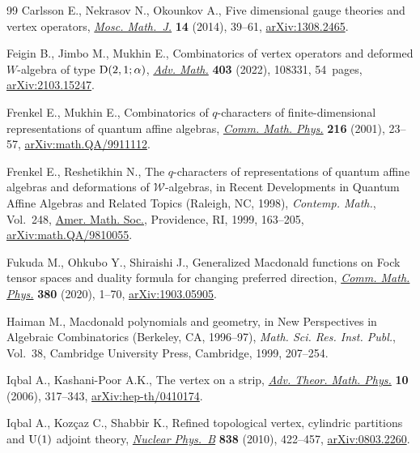 \documentclass[pdftex]{sigma}%
\numberwithin{equation}{section}
\begin{document}
\begin{thebibliography}{99}
Carlsson E., Nekrasov N., Okounkov A., Five dimensional gauge theories and
 vertex operators, \href{https://doi.org/10.17323/1609-4514-2014-14-1-39-61}{\textit{Mosc. Math.~J.}} \textbf{14} (2014), 39--61,
 \href{https://arxiv.org/abs/1308.2465}{arXiv:1308.2465}.

Feigin B., Jimbo M., Mukhin E., Combinatorics of vertex operators and deformed
 $W$-algebra of type {${\rm D}(2, 1; \alpha)$}, \href{https://doi.org/10.1016/j.aim.2022.108331}{\textit{Adv. Math.}}
 \textbf{403} (2022), 108331, 54~pages, \href{https://arxiv.org/abs/2103.15247}{arXiv:2103.15247}.

Frenkel E., Mukhin E., Combinatorics of $q$-characters of finite-dimensional
 representations of quantum affine algebras, \href{https://doi.org/10.1007/s002200000323}{\textit{Comm. Math. Phys.}}
 \textbf{216} (2001), 23--57, \href{https://arxiv.org/abs/math.QA/9911112}{arXiv:math.QA/9911112}.

Frenkel E., Reshetikhin N., The {$q$}-characters of representations of quantum
 affine algebras and deformations of {$\mathcal W$}-algebras, in Recent
 Developments in Quantum Affine Algebras and Related Topics ({R}aleigh, {NC},
 1998), \textit{Contemp. Math.}, Vol.~248, \href{https://doi.org/10.1090/conm/248/03823}{Amer. Math. Soc.}, Providence, RI,
 1999, 163--205, \href{https://arxiv.org/abs/math.QA/9810055}{arXiv:math.QA/9810055}.

Fukuda M., Ohkubo Y., Shiraishi J., Generalized {M}acdonald functions on {F}ock
 tensor spaces and duality formula for changing preferred direction,
 \href{https://doi.org/10.1007/s00220-020-03872-4}{\textit{Comm. Math. Phys.}} \textbf{380} (2020), 1--70, \href{https://arxiv.org/abs/1903.05905}{arXiv:1903.05905}.

Haiman M., Macdonald polynomials and geometry, in New Perspectives in Algebraic
 Combinatorics ({B}erkeley, {CA}, 1996--97), \textit{Math. Sci. Res. Inst.
 Publ.}, Vol.~38, Cambridge University Press, Cambridge, 1999, 207--254.

Iqbal A., Kashani-Poor A.K., The vertex on a strip, \href{https://dx.doi.org/10.4310/ATMP.2006.v10.n3.a2}{\textit{Adv. Theor. Math.
 Phys.}} \textbf{10} (2006), 317--343, \href{https://arxiv.org/abs/hep-th/0410174}{arXiv:hep-th/0410174}.

Iqbal A., Koz\c{c}az C., Shabbir K., Refined topological vertex, cylindric
 partitions and {$\rm U(1)$} adjoint theory, \href{https://doi.org/10.1016/j.nuclphysb.2010.06.010}{\textit{Nuclear Phys.~B}}
 \textbf{838} (2010), 422--457, \href{https://arxiv.org/abs/0803.2260}{arXiv:0803.2260}.


\end{thebibliography}
\end{document}

